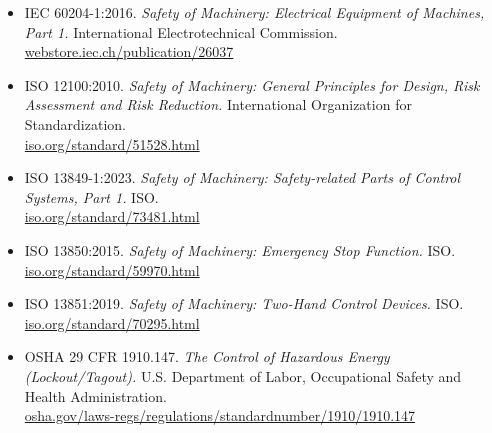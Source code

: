 \documentclass[hidelinks,12pt]{article}
\begin{document}
\begin{itemize}
    \item IEC 60204-1:2016. \emph{Safety of Machinery: Electrical Equipment of Machines, Part 1.} International Electrotechnical Commission. \\
      \href{https://webstore.iec.ch/publication/26037}{webstore.iec.ch/publication/26037}
    \item ISO 12100:2010. \emph{Safety of Machinery: General Principles for Design, Risk Assessment and Risk Reduction.} International Organization for Standardization. \\
      \href{https://www.iso.org/standard/51528.html}{iso.org/standard/51528.html}
    \item ISO 13849-1:2023. \emph{Safety of Machinery: Safety-related Parts of Control Systems, Part 1.} ISO. \\
      \href{https://www.iso.org/standard/73481.html}{iso.org/standard/73481.html}
    \item ISO 13850:2015. \emph{Safety of Machinery: Emergency Stop Function.} ISO. \\
      \href{https://www.iso.org/standard/59970.html}{iso.org/standard/59970.html}
    \item ISO 13851:2019. \emph{Safety of Machinery: Two-Hand Control Devices.} ISO. \\
      \href{https://www.iso.org/standard/70295.html}{iso.org/standard/70295.html}
    \item OSHA 29 CFR 1910.147. \emph{The Control of Hazardous Energy (Lockout/Tagout).} U.S. Department of Labor, Occupational Safety and Health Administration. \\
      \href{https://www.osha.gov/laws-regs/regulations/standardnumber/1910/1910.147}{osha.gov/laws-regs/regulations/standardnumber/1910/1910.147}
\end{itemize}
\end{document}
